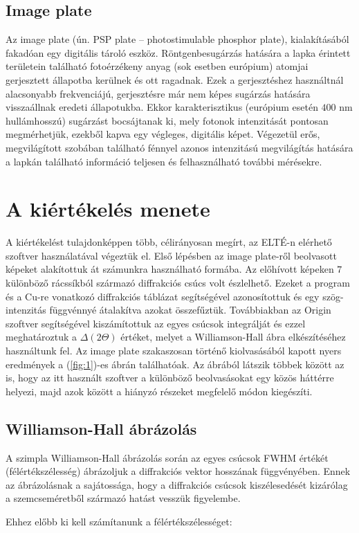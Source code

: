 \begin{multicols}{2}
\subsection{Image plate}
Az image plate (ún. PSP plate -- photostimulable phosphor plate), kialakításából fakadóan egy digitális tároló eszköz. Röntgenbesugárzás hatására a lapka érintett területein található fotoérzékeny anyag (sok esetben európium) atomjai gerjesztett állapotba kerülnek és ott ragadnak. Ezek a gerjesztéshez használtnál alacsonyabb frekvenciájú, gerjesztésre már nem képes sugárzás hatására visszaállnak eredeti állapotukba. Ekkor karakterisztikus (európium esetén $400$ nm hullámhosszú) sugárzást bocsájtanak ki, mely fotonok intenzitását pontosan megmérhetjük, ezekből kapva egy végleges, digitális képet. Végezetül erős, megvilágított szobában található fénnyel azonos intenzitású megvilágítás hatására a lapkán található információ teljesen  és felhasználható további mérésekre.

\section{A kiértékelés menete}
A kiértékelést tulajdonképpen több, célirányosan megírt, az ELTÉ-n elérhető szoftver használatával végeztük el. Első lépésben az image plate-ről beolvasott képeket alakítottuk át számunkra használható formába. Az előhívott képeken $7$ különböző rácssíkból származó diffrakciós csúcs volt észlelhető. Ezeket a program és a Cu-re vonatkozó diffrakciós táblázat segítségével azonosítottuk és egy szög-intenzitás függvénnyé átalakítva azokat összefűztük. Továbbiakban az Origin szoftver segítségével kiszámítottuk az egyes csúcsok integrálját és ezzel meghatároztuk a $\Delta \left( 2 \Theta \right)$ értéket, melyet a Williamson-Hall ábra elkészítéséhez használtunk fel. Az image plate szakaszosan történő kiolvasásából kapott nyers eredmények a (\ref{fig:1})-es ábrán találhatóak. Az ábrából látszik többek között az is, hogy az itt használt szoftver a különböző beolvasásokat egy közös háttérre helyezi, majd azok között a hiányzó részeket megfelelő módon kiegészíti.

\subsection{Williamson-Hall ábrázolás}
A szimpla Williamson-Hall ábrázolás során az egyes csúcsok FWHM értékét (félértékszélesség) ábrázoljuk a diffrakciós vektor hosszának függvényében. Ennek az ábrázolásnak a sajátossága, hogy a diffrakciós csúcsok kiszélesedését kizárólag a szemcseméretből származó hatást vesszük figyelembe. \par
Ehhez előbb ki kell számítanunk a félértékszélességet:


\end{multicols}

